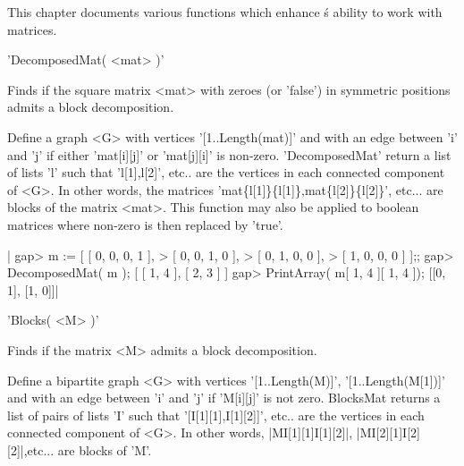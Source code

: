 

This  chapter documents various functions  which enhance \GAP\'s ability
to work with matrices.

%
%

'DecomposedMat( <mat> )'

Finds  if the  square matrix  <mat> with  zeroes (or  'false') in symmetric
positions admits a block decomposition.

Define  a  graph  <G>  with  vertices  '[1..Length(mat)]'  and with an edge
between  'i'  and  'j'  if  either  'mat[i][j]' or 'mat[j][i]' is non-zero.
'DecomposedMat' return a list of lists 'l' such that 'l[1],l[2]', etc.. are
the  vertices  in  each  connected  component  of  <G>. In other words, the
matrices  'mat\{l[1]\}\{l[1]\},mat\{l[2]\}\{l[2]\}',  etc...  are blocks of
the  matrix <mat>.  This function  may also  be applied to boolean matrices
where non-zero is then replaced by 'true'.

|    gap> m := [ [  0,  0,  0,  1 ],
    >           [  0,  0,  1,  0 ],
    >           [  0,  1,  0,  0 ],
    >           [  1,  0,  0,  0 ] ];;
    gap> DecomposedMat( m );
    [ [ 1, 4 ], [ 2, 3 ] ]
    gap> PrintArray( m{[ 1, 4 ]}{[ 1, 4 ]});
    [[0, 1],
     [1, 0]]|

%
%

'Blocks( <M> )'

Finds  if the  matrix  <M> admits a block decomposition.

Define    a   bipartite   graph   <G>   with   vertices   '[1..Length(M)]',
'[1..Length(M[1])]'  and with an  edge between 'i'  and 'j' if 'M[i][j]' is
not  zero.  BlocksMat  returns  a  list  of  pairs  of  lists 'I' such that
'[I[1][1],I[1][2]]',  etc.. are the vertices in each connected component of
<G>.  In  other  words, |M{I[1][1]}{I[1][2]}|, |M{I[2][1]}{I[2][2]}|,etc...
are blocks of 'M'.

